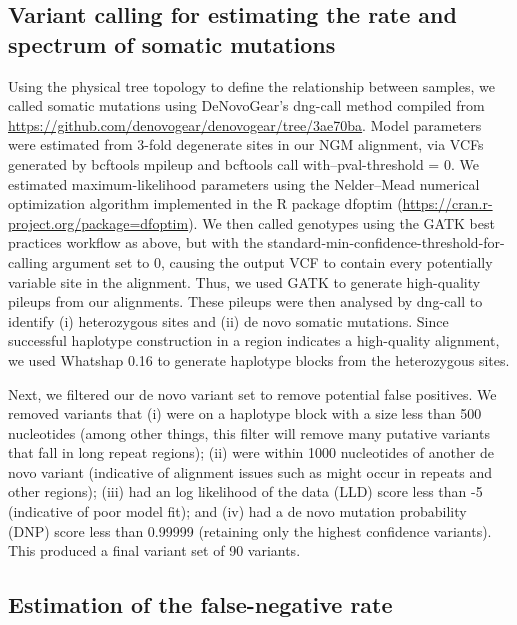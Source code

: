 \subsection{Variant calling for estimating the rate and spectrum of somatic mutations}

Using the physical tree topology to define the relationship between samples, we called somatic mutations using DeNovoGear's dng-call method \parencite{ramu_denovogear_2013} compiled from \url{https://github.com/denovogear/denovogear/tree/3ae70ba}. Model parameters were estimated from 3-fold degenerate sites in our NGM alignment, via VCFs generated by bcftools mpileup and bcftools call with--pval-threshold = 0. We estimated maximum-likelihood parameters using the Nelder–Mead numerical optimization algorithm implemented in the R package dfoptim (\url{https://cran.r-project.org/package=dfoptim}). We then called genotypes using the GATK best practices workflow as above, but with the standard-min-confidence-threshold-for-calling argument set to 0, causing the output VCF to contain every potentially variable site in the alignment. Thus, we used GATK to generate high-quality pileups from our alignments. These pileups were then analysed by dng-call to identify (i) heterozygous sites and (ii) de novo somatic mutations. Since successful haplotype construction in a region indicates a high-quality alignment, we used Whatshap 0.16 \parencite{martin_whatshap_2016} to generate haplotype blocks from the heterozygous sites.

Next, we filtered our de novo variant set to remove potential false positives. We removed variants that (i) were on a haplotype block with a size less than 500 nucleotides (among other things, this filter will remove many putative variants that fall in long repeat regions); (ii) were within 1000 nucleotides of another de novo variant (indicative of alignment issues such as might occur in repeats and other regions); (iii) had an log likelihood of the data (LLD) score less than -5 (indicative of poor model fit); and (iv) had a de novo mutation probability (DNP) score less than 0.99999 (retaining only the highest confidence variants). This produced a final variant set of 90 variants.

\subsection{Estimation of the false-negative rate}

